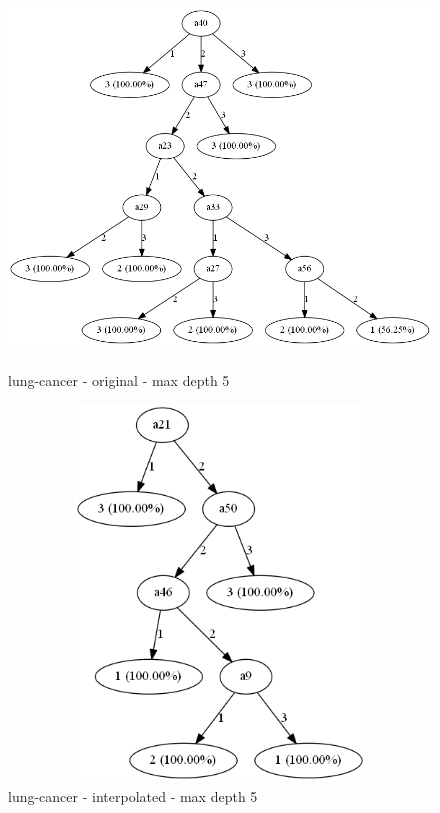 \documentclass{sig-alternate}
\begin{document}
\clearpage
\begin{figure}[!t]
    \centering
    \includegraphics[width=1.00\textwidth,height=10cm,keepaspectratio]{./images/lungCancerD5Original.png}
    \caption{lung-cancer - original - max depth 5}
    \label{figure:lungCancerD5Original}
\end{figure}
\begin{figure}[h]
    \centering
    \includegraphics[width=1.00\textwidth,height=10cm,keepaspectratio]{./images/lungCancerD5New.png}
    \caption{lung-cancer - interpolated - max depth 5}
    \label{figure:lungCancerD5New}
\end{figure}
\end{document}
